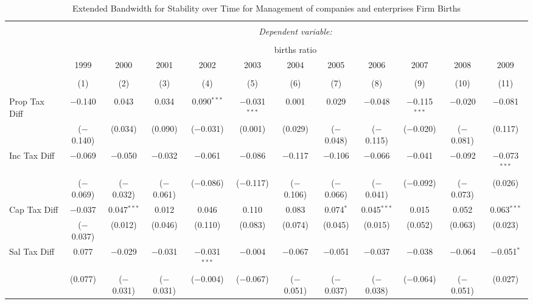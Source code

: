 
\begin{table}[!htbp] \centering 
  \caption{Extended Bandwidth for Stability over Time for  Management of companies and enterprises Firm Births} 
  \label{55year} 
\small 
\begin{tabular}{@{\extracolsep{5pt}}lccccccccccc} 
\\[-1.8ex]\hline 
\hline \\[-1.8ex] 
 & \multicolumn{11}{c}{\textit{Dependent variable:}} \\ 
\cline{2-12} 
\\[-1.8ex] & \multicolumn{11}{c}{births ratio} \\ 
 & 1999 & 2000 & 2001 & 2002 & 2003 & 2004 & 2005 & 2006 & 2007 & 2008 & 2009 \\ 
\\[-1.8ex] & (1) & (2) & (3) & (4) & (5) & (6) & (7) & (8) & (9) & (10) & (11)\\ 
\hline \\[-1.8ex] 
 Prop Tax Diff & $-$0.140 & 0.043 & 0.034 & 0.090$^{***}$ & $-$0.031$^{***}$ & 0.001 & 0.029 & $-$0.048 & $-$0.115$^{***}$ & $-$0.020 & $-$0.081 \\ 
  & ($-$0.140) & (0.034) & (0.090) & ($-$0.031) & (0.001) & (0.029) & ($-$0.048) & ($-$0.115) & ($-$0.020) & ($-$0.081) & (0.117) \\ 
  Inc Tax Diff & $-$0.069 & $-$0.050 & $-$0.032 & $-$0.061 & $-$0.086 & $-$0.117 & $-$0.106 & $-$0.066 & $-$0.041 & $-$0.092 & $-$0.073$^{***}$ \\ 
  & ($-$0.069) & ($-$0.032) & ($-$0.061) & ($-$0.086) & ($-$0.117) & ($-$0.106) & ($-$0.066) & ($-$0.041) & ($-$0.092) & ($-$0.073) & (0.026) \\ 
  Cap Tax Diff & $-$0.037 & 0.047$^{***}$ & 0.012 & 0.046 & 0.110 & 0.083 & 0.074$^{*}$ & 0.045$^{***}$ & 0.015 & 0.052 & 0.063$^{***}$ \\ 
  & ($-$0.037) & (0.012) & (0.046) & (0.110) & (0.083) & (0.074) & (0.045) & (0.015) & (0.052) & (0.063) & (0.023) \\ 
  Sal Tax Diff & 0.077 & $-$0.029 & $-$0.031 & $-$0.031$^{***}$ & $-$0.004 & $-$0.067 & $-$0.051 & $-$0.037 & $-$0.038 & $-$0.064 & $-$0.051$^{*}$ \\ 
  & (0.077) & ($-$0.031) & ($-$0.031) & ($-$0.004) & ($-$0.067) & ($-$0.051) & ($-$0.037) & ($-$0.038) & ($-$0.064) & ($-$0.051) & (0.027) \\ 

\end{tabular}
\end{table}
